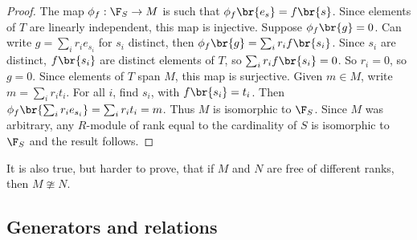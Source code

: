 \begin{proof}
The map $ \phi_f : \F_S \to M $ is such that $ \phi_f\br{e_s} = f\br{s} $. Since elements of $ T $ are linearly independent, this map is injective. Suppose $ \phi_f\br{g} = 0 $. Can write $ g = \sum_i r_ie_{s_i} $ for $ s_i $ distinct, then $ \phi_f\br{g} = \sum_i r_if\br{s_i} $. Since $ s_i $ are distinct, $ f\br{s_i} $ are distinct elements of $ T $, so $ \sum_i r_if\br{s_i} = 0 $. So $ r_i = 0 $, so $ g = 0 $. Since elements of $ T $ span $ M $, this map is surjective. Given $ m \in M $, write $ m = \sum_i r_it_i $. For all $ i $, find $ s_i $, with $ f\br{s_i} = t_i $. Then $ \phi_f\br{\sum_i r_ie_{s_i}} = \sum_i r_it_i = m $. Thus $ M $ is isomorphic to $ \F_S $. Since $ M $ was arbitrary, any $ R $-module of rank equal to the cardinality of $ S $ is isomorphic to $ \F_S $ and the result follows.
\end{proof}

\begin{note*}
It is also true, but harder to prove, that if $ M $ and $ N $ are free of different ranks, then $ M \ncong N $.
\end{note*}

\pagebreak

\subsection{Generators and relations}



